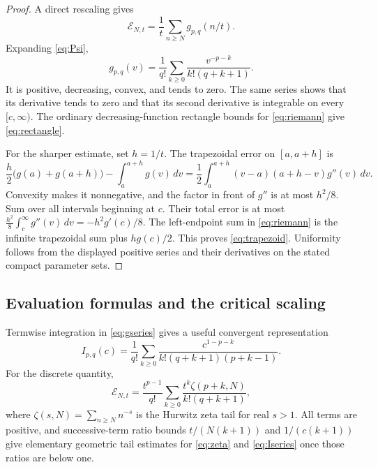 \documentclass[11pt,a4paper]{article}
\numberwithin{equation}{section}
\theoremstyle{definition}
\theoremstyle{remark}
\begin{document}
\begin{proof}
A direct rescaling gives
\begin{equation}\label{eq:riemann}
 \mathcal E_{N,t}=\frac1t\sum_{n\geq N}g_{p,q}(n/t).
\end{equation}
Expanding \eqref{eq:Psi},
\begin{equation}\label{eq:gseries}
 g_{p,q}(v)=\frac1{q!}\sum_{k\geq0}
                       \frac{v^{-p-k}}{k!(q+k+1)}.
\end{equation}
It is positive, decreasing, convex, and tends to zero. The same series
shows that its derivative tends to zero and that its second derivative is
integrable on every $[c,\infty)$. The ordinary decreasing-function
rectangle bounds for \eqref{eq:riemann} give \eqref{eq:rectangle}.

For the sharper estimate, set $h=1/t$. The trapezoidal error on
$[a,a+h]$ is
\[
 \frac h2\bigl(g(a)+g(a+h)\bigr)-\int_a^{a+h}g(v)\,dv
 =\frac12\int_a^{a+h}(v-a)(a+h-v)g''(v)\,dv.
\]
Convexity makes it nonnegative, and the factor in front of $g''$ is at
most $h^2/8$. Sum over all intervals beginning at $c$.
Their total error is at most
$\frac{h^2}{8}\int_c^\infty g''(v)\,dv=-h^2g'(c)/8$.
The left-endpoint sum in \eqref{eq:riemann} is the infinite trapezoidal sum
plus $hg(c)/2$. This proves \eqref{eq:trapezoid}. Uniformity follows from
the displayed positive series and their derivatives on the stated compact
parameter sets.
\end{proof}

\subsection{Evaluation formulas and the critical scaling}
Termwise integration in \eqref{eq:gseries} gives a useful convergent
representation
\begin{equation}\label{eq:Iseries}
 I_{p,q}(c)=\frac1{q!}\sum_{k\geq0}
       \frac{c^{1-p-k}}{k!(q+k+1)(p+k-1)}.
\end{equation}
For the discrete quantity,
\begin{equation}\label{eq:zeta}
 \mathcal E_{N,t}
 =\frac{t^{p-1}}{q!}\sum_{k\geq0}
       \frac{t^k\zeta(p+k,N)}{k!(q+k+1)},
\end{equation}
where $\zeta(s,N)=\sum_{n\geq N}n^{-s}$ is the Hurwitz zeta tail for
real $s>1$. All terms are positive, and successive-term ratio bounds
$t/(N(k+1))$ and $1/(c(k+1))$ give elementary geometric tail estimates for
\eqref{eq:zeta} and \eqref{eq:Iseries} once those ratios are below one.
\end{document}
